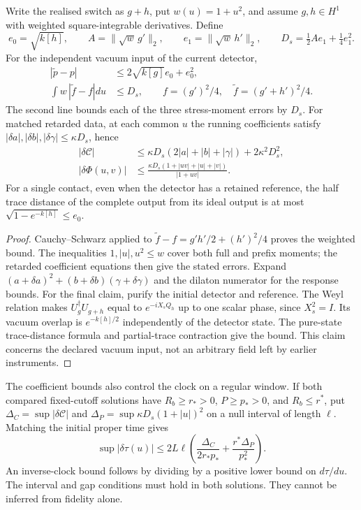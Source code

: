 \begin{proposition}
\label{prop:joint-source-bound}
Write the realised switch as $g+h$, put $w(u)=1+u^2$, and assume
$g,h\in H^1$ with weighted square-integrable derivatives. Define
\[
 e_0=\sqrt{k[h]},\qquad A=\|\sqrt w\,g'\|_2,\qquad
 e_1=\|\sqrt w\,h'\|_2,\qquad D_s=\tfrac12Ae_1+\tfrac14e_1^2.
\]
For the independent vacuum input of the current detector,
\begin{align}
 |\widetilde p-p|&\le2\sqrt{k[g]}e_0+e_0^2,\nonumber\\
 \int w\,|\widetilde f-f|du&\le D_s,\qquad
 f=(g')^2/4,\quad \widetilde f=(g'+h')^2/4.
 \label{eq:joint-source-bound}
\end{align}
The second line bounds each of the three stress-moment errors by $D_s$.
For matched retarded data, at each common $u$ the running coefficients satisfy
$|\delta a|,|\delta b|,|\delta\gamma|\le\kappa D_s$, hence
\begin{align}
 |\delta\mathcal C|&\le
 \kappa D_s(2|a|+|b|+|\gamma|)+2\kappa^2D_s^2,\nonumber\\
 |\delta\Phi(u,v)|&\le
 \frac{\kappa D_s(1+|uv|+|u|+|v|)}{|1+uv|}.
 \label{eq:source-response-certificate}
\end{align}
For a single contact, even when the detector has a retained reference,
the half trace distance of the complete output from its ideal output is at
most $\sqrt{1-e^{-k[h]}}\le e_0$.
\end{proposition}
\begin{proof}
Cauchy--Schwarz applied to
$\widetilde f-f=g'h'/2+(h')^2/4$ proves the weighted bound.
The inequalities $1,|u|,u^2\le w$ cover both full and prefix moments;
the retarded coefficient equations then give the stated errors.
Expand $(a+\delta a)^2+(b+\delta b)(\gamma+\delta\gamma)$ and the
dilaton numerator for the response bounds.
For the final claim, purify the initial detector and reference.
The Weyl relation makes $U_g^\dagger U_{g+h}$ equal to
$e^{-iX_sQ_h}$ up to one scalar phase, since $X_s^2=I$.
Its vacuum overlap is $e^{-k[h]/2}$ independently of the detector state.
The pure-state trace-distance formula and partial-trace contraction give
the bound. This claim concerns the declared vacuum input, not an arbitrary
field left by earlier instruments.
\end{proof}

The coefficient bounds also control the clock on a regular window.
If both compared fixed-cutoff solutions have
$R_b\ge r_*>0$, $P\ge p_*>0$, and $R_b\le r^*$, put
$\Delta_C=\sup|\delta\mathcal C|$ and
$\Delta_P=\sup\kappa D_s(1+|u|)^2$ on a null interval of length $\ell$.
Matching the initial proper time gives
\[
 \sup|\delta\tau(u)|\le
 2L\ell\left(\frac{\Delta_C}{2r_*p_*}
                 +\frac{r^*\Delta_P}{p_*^2}\right).
\]
An inverse-clock bound follows by dividing by a positive lower bound on
$d\tau/du$. The interval and gap conditions must hold in both solutions.
They cannot be inferred from fidelity alone.


